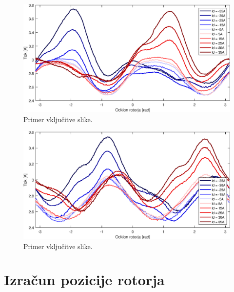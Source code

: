 \documentclass[a4paper,twoside,openright,12pt,slovene]{book}
\begin{document}
\begin{figure}[!htbp]
    \centering
    \includegraphics[width=1\columnwidth]{Slike/tokovniOdzivIs_IdAmp.eps}
    \caption{\label{tokovniOdzivIs_IdAmp} Primer vključitve slike.}
\end{figure}

\begin{figure}[!htbp]
    \centering
    \includegraphics[width=1\columnwidth]{Slike/tokovniOdzivIs_IqAmp.eps}
    \caption{\label{tokovniOdzivIs_IqAmp} Primer vključitve slike.}
\end{figure}

%
% 
%


\section{Izračun pozicije rotorja}
\end{document}
